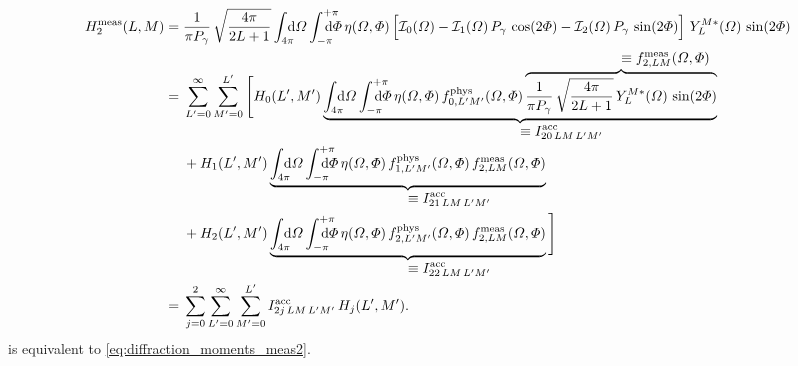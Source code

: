 \begin{align}
  H_2^\text{meas}(L, M)
  ={}& \frac{1}{\pi P_\gamma}\, \sqrt{\frac{4 \pi}{2 L + 1}} \int_{4 \pi}\!\!\!\! \dif{\Omega} \int_{-\pi}^{+\pi}\hspace{-1.2em} \dif{\Phi}\,
  \eta(\Omega, \Phi) \sBrk[2]{\mathcal{I}_0(\Omega)
  - \mathcal{I}_1(\Omega)\, P_\gamma\, \cos(2 \Phi)
  - \mathcal{I}_2(\Omega)\, P_\gamma\, \sin(2 \Phi)}\,
  Y_L^{M *}(\Omega)\, \sin(2 \Phi) \notag
  \\
  ={}& \sum_{L' = 0}^\infty \sum_{M' = 0}^{L'} \Bigg[
  H_0(L', M')\,
  \rdUnderbrace{\int_{4 \pi}\!\!\!\! \dif{\Omega} \int_{-\pi}^{+\pi}\hspace{-1.2em} \dif{\Phi}\,
  \eta(\Omega, \Phi)\,
  f_{0, L' M'}^\text{phys}(\Omega, \Phi)\,
  \rdOverbrace{\frac{1}{\pi P_\gamma}\, \sqrt{\frac{4 \pi}{2 L + 1}}\, Y_L^{M *}(\Omega)\, \sin(2 \Phi)}{\equiv f_{2, L M}^\text{meas}(\Omega, \Phi)}}%
  {\equiv I^\text{acc}_{2 0\, L M\, L' M'}} \notag
  \\
  & + H_1(L', M')\,
  \rdUnderbrace{\int_{4 \pi}\!\!\!\! \dif{\Omega} \int_{-\pi}^{+\pi}\hspace{-1.2em} \dif{\Phi}\,
  \eta(\Omega, \Phi)\,
  f_{1, L' M'}^\text{phys}(\Omega, \Phi)\,
  f_{2, L M}^\text{meas}(\Omega, \Phi)}%
  {\equiv I^\text{acc}_{2 1\, L M\, L' M'}} \notag
  \\
  & + H_2(L', M')\,
  \rdUnderbrace{\int_{4 \pi}\!\!\!\! \dif{\Omega} \int_{-\pi}^{+\pi}\hspace{-1.2em} \dif{\Phi}\,
  \eta(\Omega, \Phi)\,
  f_{2, L' M'}^\text{phys}(\Omega, \Phi)\,
  f_{2, L M}^\text{meas}(\Omega, \Phi)}%
  {\equiv I^\text{acc}_{2 2\, L M\, L' M'}}\, \Bigg] \notag
  \\
  \label{eq:photoprod_moment_2_meas2}
  ={}& \sum_{j = 0}^2 \sum_{L' = 0}^\infty \sum_{M' = 0}^{L'}
  I^\text{acc}_{2 j\, L M\, L' M'}\, H_j(L', M').
\end{align}
 is equivalent to
\cref{eq:diffraction_moments_meas2}.

